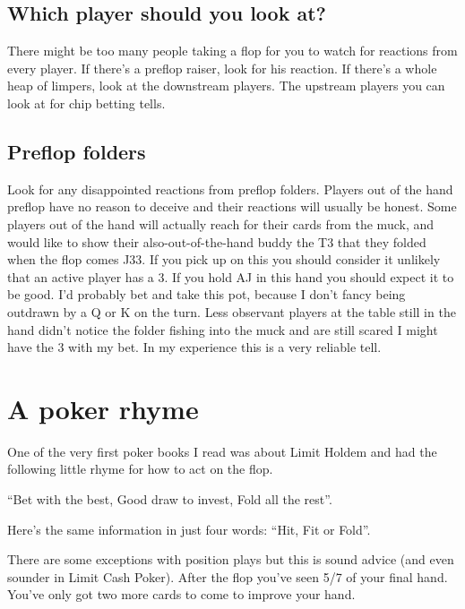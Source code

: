 \subsection{Which player should you look at?}

There might be too many people taking a flop for you to watch for
reactions from every player. If there's a preflop raiser, look
for his reaction. If there's a whole heap of limpers,
look at the downstream players. The upstream players you can look at
for chip betting tells.

\subsection{Preflop folders}

Look for any disappointed reactions from preflop folders. Players
out of the hand preflop have no reason to deceive and their
reactions will usually be honest. Some players out of the hand
will actually reach for their cards from the muck, and would like
to show their also-out-of-the-hand buddy the T3 that they folded
when the flop comes J33. If you pick up on this you should consider
it unlikely that an active player has a 3. If you hold AJ in this
hand you should expect it to be good. I'd probably bet and take this
pot, because I don't fancy being outdrawn by a Q or K on the turn.
Less observant players at the table still in the hand didn't notice
the folder fishing into the muck and are still scared I might
have the 3 with my bet. In my experience this is a very reliable tell.

\section{A poker rhyme}

One of the very first poker books I read was about Limit Holdem and
had the following little rhyme for how to act on the flop.

``Bet with the best, Good draw to invest, Fold all the rest''.


Here's the same information in just four words: ``Hit, Fit or Fold''.

There are some exceptions with position plays but this is sound
advice (and even sounder in Limit Cash Poker). After the flop
you've seen 5/7 of your final hand. You've only got two
more cards to come to improve your hand.


